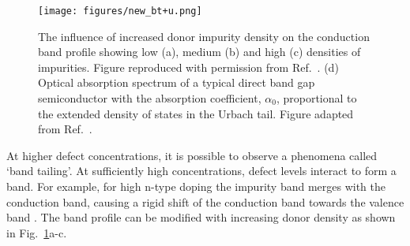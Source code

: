 \documentclass[11pt, twoside]{report}
\begin{document}
\begin{figure}[h!]
  \centering
    \texttt{[image: figures/new\_﻿bt+u.png]}
    \caption[The influence of increased donor impurity density on the conduction band profile showing low (a), medium (b) and high (c) densities of impurities. (d) Optical absorption spectrum of a typical direct band gap semiconductor with the absorption coefficient, $\alpha_{0}$, proportional to the extended density of states in the Urbach tail.]{The influence of increased donor impurity density on the conduction band profile showing low (a), medium (b) and high (c) densities of impurities. Figure reproduced with permission from Ref.~. (d) Optical absorption spectrum of a typical direct band gap semiconductor with the absorption coefficient, $\alpha_{0}$, proportional to the extended density of states in the Urbach tail. Figure adapted from Ref.~.}
  \label{bs2}
\end{figure}

At higher defect concentrations, it is possible to observe a phenomena called `band tailing'. At sufficiently high concentrations, defect levels interact to form a band. For example, for high n-type doping the impurity band merges with the conduction band, causing a rigid shift of the conduction band towards the valence band \cite{Pankove}. The band profile can be modified with increasing donor density as shown in Fig.~\ref{bs2}a-c. 
\end{document}
